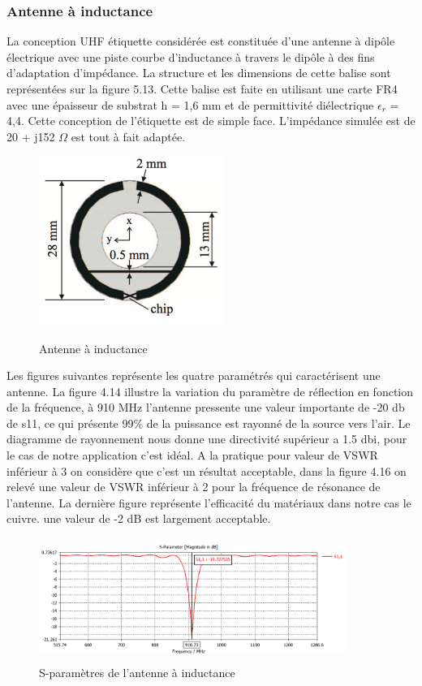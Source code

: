 \documentclass[11pt, a4paper, twoside]{book}
\begin{document}
\subsubsection{Antenne à inductance}


La conception UHF étiquette considérée est constituée d’une antenne à dipôle électrique avec une piste courbe d’inductance à travers le dipôle à des fins d'adaptation d'impédance. La structure et les dimensions de cette balise sont représentées sur la figure 5.13. Cette balise est faite en utilisant une carte FR4 avec une épaisseur de substrat h = 1,6 mm et de permittivité diélectrique \(\epsilon_{r}\) = 4,4. Cette conception de l’étiquette est de simple face. L'impédance simulée est de 20 + j152 \(\Omega\) est tout à fait adaptée.\\
 
 \begin{figure}[H]
\centering
\includegraphics[width=6cm]{dofi}\\
\caption{Antenne à inductance}
\end{figure} 

Les figures suivantes représente les quatre paramétrés qui caractérisent une antenne. La figure 4.14 illustre
la variation du paramètre de réflection en fonction de la fréquence, à 910 MHz l'antenne pressente une valeur importante de -20 db de s11, ce qui présente 99\% de la puissance est rayonné de la source vers l'air. Le diagramme de rayonnement  nous donne une directivité supérieur a 1.5 dbi, pour le cas de notre application c'est idéal. A la pratique pour valeur de VSWR inférieur à 3 on considère que c'est un résultat acceptable, dans la figure 4.16  on relevé une valeur de VSWR inférieur à 2 pour la fréquence de résonance de l'antenne. La dernière figure représente l'efficacité du matériaux dans notre cas le cuivre. une valeur de -2 dB est largement acceptable.
\begin{figure}[H]
\centering
\includegraphics[width=10cm,height=4cm]{clas11}
\caption{S-paramètres de l'antenne à inductance}
\end{figure} 
\end{document}
